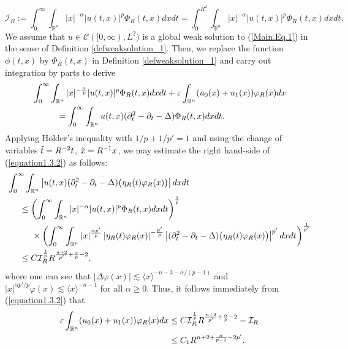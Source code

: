 \documentclass[11pt,reqno]{amsart}
\newcommand{\R}{\mathbb{R}}
\newcommand{\ity}{\infty}
\begin{document}
$$ \mathcal{I}_{R}:= \int_0^{\ity}\int_{\R^n} |x|^{-\alpha}|u(t,x)|^p \Phi_{R}(t,x) dxdt= \int_{0}^{R^{2}}\int_{\mathbb{R}^n} |x|^{-\alpha}|u(t,x)|^p \Phi_{R}(t,x) dxdt. $$
 We assume that $u \in \mathcal{C}([0, \infty), L^2)$ is a global weak solution to (\ref{Main.Eq.1}) in the sense of Definition \ref{defweaksolution_1}. Then, we replace the function $\phi(t,x)$ by $\Phi_{R}(t,x)$ in Definition \ref{defweaksolution_1} and carry out integration by parts to derive
    \begin{align}
    &\int_0^{\infty}\int_{\mathbb{R}^n} |x|^{-\frac{\alpha}{p}} |u(t,x)|^p \Phi_{R}(t, x) dxdt +\varepsilon\int_{\mathbb{R}^n} (u_0(x)+u_1(x))\varphi_R(x)dx\notag \notag\\
    &\hspace{1cm}= \int_0^{\infty} \int_{\mathbb{R}^n} u(t,x) (\partial_t^2 -\partial_t-\Delta) \Phi_{R}(t,x) dx dt.\label{equation1.3.2}
\end{align}
Applying H\"older's inequality with $1/p + 1/p' = 1$  and using the change of variables $\Tilde{t} = R^{-2} t$, $\Tilde{x} = R^{-1} x$, we may estimate the right hand-side of (\ref{equation1.3.2}) as follows:
    \begin{align*}
        &\int_0^{\infty} \int_{\mathbb{R}^n} \left|u(t,x) (\partial_t^2 -\partial_t-\Delta)\big(\eta_R(t) \varphi_R(x)\big)\right| dxdt\\
        &\hspace{0.5cm} \leq \left(\int_0^\infty \int_{\mathbb{R}^n} |x|^{-\alpha}|u(t,x)|^p \Phi_R(t,x)dxdt\right)^{\frac{1}{p}}\\
        &\hspace{1cm}\times\left(\int_0^{\infty}\int_{\mathbb{R}^n}|x|^{\frac{\alpha p'}{p}}\left|\eta_R(t)\varphi_{R}(x)\right|^{-\frac{p'}{p}} \left|(\partial_t^2 -\partial_t-\Delta)\big(\eta_R(t) \varphi_R(x)\big)\right|^{p'} dxdt\right)^{\frac{1}{p'}} \\
        &\hspace{0.5cm}\leq C \mathcal{I}_R^{\frac{1}{p}} R^{\frac{n+2}{p'}+\frac{\alpha}{p}-2},
    \end{align*}
    where one can see that $|\Delta \varphi(x)| \lesssim \langle x\rangle^{-n-3-\alpha/(p-1)}$ and $|x|^{\alpha p'/p} \varphi(x) \lesssim \langle x \rangle^{-n-1}$ for all $\alpha \geq 0$.
Thus, it follows immediately from (\ref{equation1.3.2}) that
    \begin{align*}
\varepsilon\int_{\mathbb{R}^n} (u_0(x)+u_1(x))\varphi_R(x)dx &\leq C \mathcal{I}_R^{\frac{1}{p}} R^{\frac{n+2}{p'}+\frac{\alpha}{p}-2}- \mathcal{I}_R \notag\\
&\leq C_1 R^{n+2+\frac{\alpha}{p-1}-2p'}. 
    \end{align*}
\end{document}
